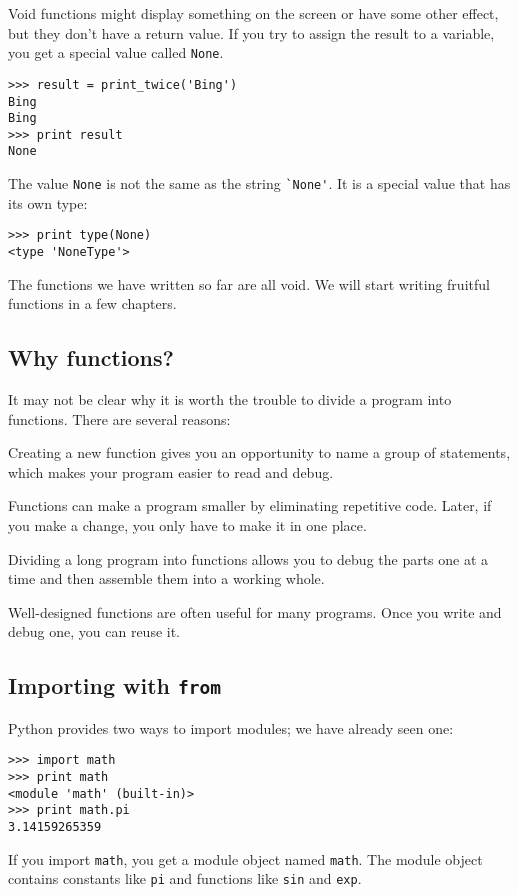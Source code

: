 \documentclass{article}
\begin{document}
Void functions might display something on the screen or have some
other effect, but they don’t have a return value. If you try to assign
the result to a variable, you get a special value called \verb|None|.
\begin{verbatim}
>>> result = print_twice('Bing')
Bing
Bing
>>> print result
None
\end{verbatim}
The value \verb|None| is not the same as the string \verb|`None'|.
It is a special value that has its own type:
\begin{verbatim}
>>> print type(None)
<type 'NoneType'>
\end{verbatim}
The functions we have written so far are all void. We will start
writing fruitful functions in a few chapters.

\subsection{Why functions?}
It may not be clear why it is worth the trouble to divide a program
into functions. There are several reasons:
\begin{itemize*}
    \item Creating a new function gives you an opportunity to name a group of
        statements, which makes your program easier to read and debug.
    \item Functions can make a program smaller by eliminating repetitive code.
        Later, if you make a change, you only have to make it in one place.
    \item Dividing a long program into functions allows you to debug the parts
        one at a time and then assemble them into a working whole.
    \item Well-designed functions are often useful for many programs. Once you
        write and debug one, you can reuse it.
\end{itemize*}



\subsection{Importing with \texttt{from}}
Python provides two ways to import modules; we have already seen one:
\begin{verbatim}
>>> import math
>>> print math
<module 'math' (built-in)>
>>> print math.pi
3.14159265359
\end{verbatim}
If you import \verb|math|, you get a module object named \verb|math|.
The module object contains constants like \verb|pi| and functions like
\verb|sin| and \verb|exp|.
\end{document}
